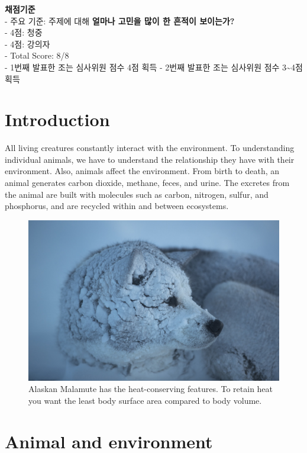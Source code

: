\documentclass[]{book}
\begin{document}
\textbf{채점기준}\\
- 주요 기준: 주제에 대해 \textbf{얼마나 고민을 많이 한 흔적이
보이는가?}\\
- 4점: 청중\\
- 4점: 강의자\\
- Total Score: 8/8\\
- 1번째 발표한 조는 심사위원 점수 4점 획득 - 2번째 발표한 조는 심사위원
점수 3\textasciitilde{}4점 획득

\chapter{Introduction}\label{intro}

All living creatures constantly interact with the environment. To
understanding individual animals, we have to understand the relationship
they have with their environment. Also, animals affect the environment.
From birth to death, an animal generates carbon dioxide, methane, feces,
and urine. The excretes from the animal are built with molecules such as
carbon, nitrogen, sulfur, and phosphorus, and are recycled within and
between ecosystems.

\begin{figure}

{\centering \includegraphics[width=1\linewidth]{figures/polar} 

}

\caption{Alaskan Malamute has the heat-conserving features. To retain heat you want the least body surface area compared to body volume.}\label{fig:snow-dog}
\end{figure}

\chapter{Animal and environment}\label{chapter2}
\end{document}
